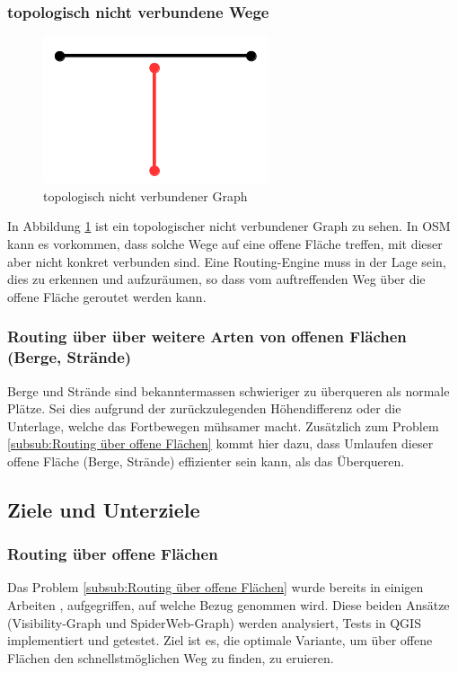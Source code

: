 \subsubsection{topologisch nicht verbundene Wege}
\label{subsub:topologisch nicht verbundene Wege}

\begin{figure}[ht]
\centering
\includegraphics[width=0.5\linewidth]{technicalreport/img/topologisch_nicht_verbundener_graph}
\caption[topologisch nicht verbundener Graph]{topologisch nicht verbundener Graph}
\label{fig:topologisch_nicht_verbundener_graph}
\end{figure}

In Abbildung \ref{fig:topologisch_nicht_verbundener_graph} ist ein topologischer nicht verbundener Graph zu sehen. In OSM kann es vorkommen, dass solche Wege auf eine offene Fläche treffen, mit dieser aber nicht konkret verbunden sind. Eine Routing-Engine muss in der Lage sein, dies zu erkennen und aufzuräumen, so dass vom auftreffenden Weg über die offene Fläche geroutet werden kann.

\subsubsection{Routing über über weitere Arten von offenen Flächen (Berge, Strände)}
\label{subsub:Routing über über weitere Arten von offenen Flächen (Berge, Strände)}
Berge und Strände sind bekanntermassen schwieriger zu überqueren als normale Plätze. Sei dies aufgrund der zurückzulegenden Höhendifferenz oder die Unterlage, welche das Fortbewegen mühsamer macht. Zusätzlich zum Problem \ref{subsub:Routing über offene Flächen} kommt hier dazu, dass Umlaufen dieser offene Fläche (Berge, Strände) effizienter sein kann, als das Überqueren.  
	
\subsection{Ziele und Unterziele}
\label{sub:Ziele und Unterziele}

\subsubsection{Routing über offene Flächen}
\label{subsub:Ziel Routing über offene Flächen}
Das Problem \ref{subsub:Routing über offene Flächen} wurde bereits in einigen Arbeiten \cite{graser_visibility_graph}, \cite{dzafic_spider_web_graph}  aufgegriffen, auf welche Bezug genommen wird. Diese beiden Ansätze (Visibility-Graph und SpiderWeb-Graph) werden analysiert, Tests in QGIS implementiert und getestet. Ziel ist es, die optimale Variante, um über offene Flächen den schnellstmöglichen Weg zu finden, zu eruieren. 

